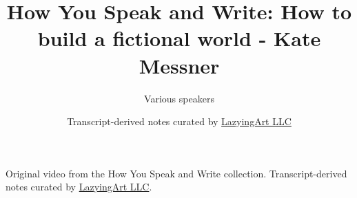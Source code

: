 \documentclass[11pt,oneside]{book}
\begin{document}
\frontmatter
\title{How You Speak and Write: How to build a fictional world - Kate Messner}
\author{Various speakers}
\date{Transcript-derived notes curated by \href{https://lazying.art}{LazyingArt LLC}}
\maketitle
\begin{center}
\small Original video from the How You Speak and Write collection. Transcript-derived notes curated by \href{https://lazying.art}{LazyingArt LLC}.
\end{center}
\clearpage
\mainmatter

\end{document}
